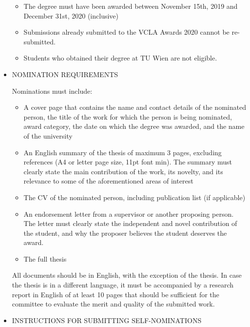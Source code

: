 \documentclass[prodmode,acmtecs]{acmsmall} %
\begin{document}
\begin{itemize}
\begin{itemize}\item  The degree must have been awarded between November 15th, 2019 and December 31st, 2020 (inclusive)
\item Submissions already submitted to the VCLA Awards 2020 cannot be re-submitted.
\item Students who obtained their degree at TU Wien are not eligible.
\end{itemize} 
\item  NOMINATION REQUIREMENTS 
 
  Nominations must include: 
 
\begin{itemize}\item  A cover page that contains the name and contact details of the nominated person, the title of the work for which the person is being nominated, award category, the date on which the degree was awarded, and the name of the university
\item  An English summary of the thesis of maximum 3 pages, excluding references (A4 or letter page size, 11pt font min). The summary must clearly state the main contribution of the work, its novelty, and its relevance to some of the aforementioned areas of interest
\item  The CV of the nominated person, including publication list (if applicable)
\item  An endorsement letter from a supervisor or another proposing person. The letter must clearly state the independent and novel contribution of the student, and why the proposer believes the student deserves the award. 
\item  The full thesis
\end{itemize} 
  All documents should be in English, with the exception of the thesis. In case the thesis is in a different language, it must be accompanied by a research report in English of at least 10 pages that should be sufficient for the committee to evaluate the merit and quality of the submitted work.  
 
\item  INSTRUCTIONS FOR SUBMITTING SELF-NOMINATIONS 
 

\end{itemize}
\end{document}
